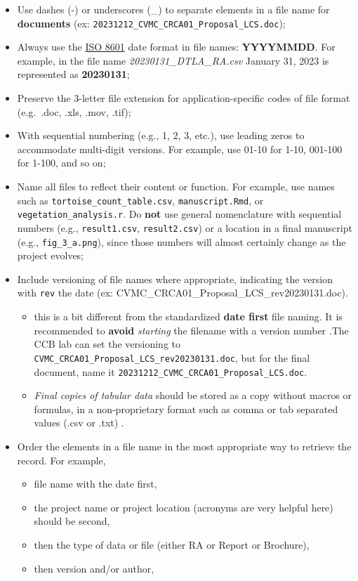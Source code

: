 \documentclass[
]{book}
\providecommand{\tightlist}{%
  \setlength{\itemsep}{0pt}\setlength{\parskip}{0pt}}
\begin{document}
\begin{itemize}
\tightlist
\item
  Use dashes (-) or underscores (\_) to separate elements in a file name for \textbf{documents} (ex: \texttt{20231212\_CVMC\_CRCA01\_Proposal\_LCS.doc});
\item
  Always use the \href{https://www.iso.org/iso-8601-date-and-time-format.html}{ISO 8601} date format in file names: \textbf{YYYYMMDD}. For example, in the file name \emph{20230131\_DTLA\_RA.csv} January 31, 2023 is represented as \textbf{20230131};
\item
  Preserve the 3-letter file extension for application-specific codes of file format (e.g.~.doc, .xls, .mov, .tif);
\item
  With sequential numbering (e.g., 1, 2, 3, etc.), use leading zeros to accommodate multi-digit versions. For example, use 01-10 for 1-10, 001-100 for 1-100, and so on;
\item
  Name all files to reflect their content or function. For example, use names such as \texttt{tortoise\_count\_table.csv}, \texttt{manuscript.Rmd}, or \texttt{vegetation\_analysis.r}. Do \textbf{not} use general nomenclature with sequential numbers (e.g., \texttt{result1.csv}, \texttt{result2.csv}) or a location in a final manuscript (e.g., \texttt{fig\_3\_a.png}), since those numbers will almost certainly change as the project evolves;
\item
  Include versioning of file names where appropriate, indicating the version with \texttt{rev} the date (ex: CVMC\_CRCA01\_Proposal\_LCS\_rev20230131.doc).

  \begin{itemize}
  \tightlist
  \item
    this is a bit different from the standardized \textbf{date first} file naming. It is recommended to \textbf{avoid} \emph{starting} the filename with a version number .The CCB lab can set the versioning to \texttt{CVMC\_CRCA01\_Proposal\_LCS\_rev20230131.doc}, but for the final document, name it \texttt{20231212\_CVMC\_CRCA01\_Proposal\_LCS.doc}.
  \item
    \emph{Final copies of tabular data} should be stored as a copy without macros or formulas, in a non-proprietary format such as comma or tab separated values (.csv or .txt) \citep{Smithsonian_2021}.
  \end{itemize}
\item
  Order the elements in a file name in the most appropriate way to retrieve the record. For example,

  \begin{itemize}
  \tightlist
  \item
    file name with the date first,
  \item
    the project name or project location (acronyms are very helpful here) should be second,
  \item
    then the type of data or file (either RA or Report or Brochure),
  \item
    then version and/or author,
  \end{itemize}
\end{itemize}
\end{document}
